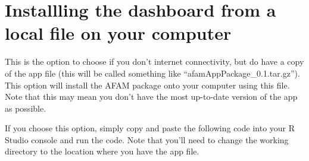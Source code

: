 \documentclass[]{book}
\newenvironment{Shaded}{\begin{snugshade}}{\end{snugshade}}
\newcommand{\KeywordTok}[1]{\textcolor[rgb]{0.13,0.29,0.53}{\textbf{#1}}}
\newcommand{\DataTypeTok}[1]{\textcolor[rgb]{0.13,0.29,0.53}{#1}}
\newcommand{\DecValTok}[1]{\textcolor[rgb]{0.00,0.00,0.81}{#1}}
\newcommand{\StringTok}[1]{\textcolor[rgb]{0.31,0.60,0.02}{#1}}
\newcommand{\OtherTok}[1]{\textcolor[rgb]{0.56,0.35,0.01}{#1}}
\newcommand{\ControlFlowTok}[1]{\textcolor[rgb]{0.13,0.29,0.53}{\textbf{#1}}}
\newcommand{\OperatorTok}[1]{\textcolor[rgb]{0.81,0.36,0.00}{\textbf{#1}}}
\newcommand{\NormalTok}[1]{#1}
\begin{document}
\begin{Shaded}
\end{Shaded}

\section{Installling the dashboard from a local file on your
computer}\label{installling-the-dashboard-from-a-local-file-on-your-computer}

This is the option to choose if you don't internet connectivity, but do
have a copy of the app file (this will be called something like
``afamAppPackage\_0.1.tar.gz''). This option will install the AFAM
package onto your computer using this file. Note that this may mean you
don't have the most up-to-date version of the app as possible.

If you choose this option, simply copy and paste the following code into
your R Studio console and run the code. Note that you'll need to change
the working directory to the location where you have the app file.
\end{document}
